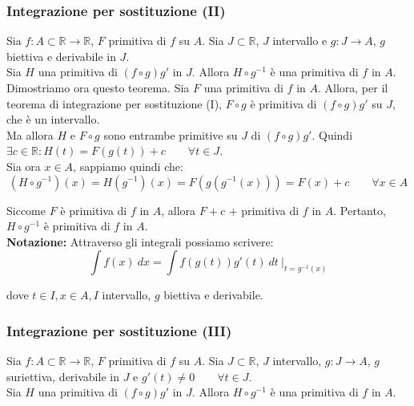 \documentclass{article}
\begin{document}
\subsubsection{Integrazione per sostituzione (II)}
Sia $f: A \subset \mathbb{R} \xrightarrow{} \mathbb{R}$, $F$ primitiva di $f$ su $A$. Sia $J \subset \mathbb{R}$, $J$ intervallo e $g: J \xrightarrow{} A$, $g$ biettiva e derivabile in $J$. \\
Sia $H$ una primitiva di $(f \circ g)g'$ in $J$. Allora $H \circ g^{-1}$ è una primitiva di $f$ in $A$.\\

\noindent Dimostriamo ora questo teorema. Sia $F$ una primitiva di $f$ in $A$. Allora, per il teorema di integrazione per sostituzione (I), $F \circ g$ è primitiva di $(f \circ g)g'$ su $J$, che è un intervallo.\\
Ma allora $H$ e $F \circ g$ sono entrambe primitive su $J$ di $(f \circ g)g'$. Quindi $\exists c \in \mathbb{R} : H(t) = F(g(t)) + c \qquad \forall t \in J$.\\
Sia ora $x \in A$, sappiamo quindi che:
\begin{equation*}
    (H \circ g^{-1})(x) = H(g^{-1})(x) = F(g(g^{-1}(x))) = F(x) + c \qquad \forall x \in A
\end{equation*}

\noindent Siccome $F$ è primitiva di $f$ in $A$, allora $F + c$ + primitiva di $f$ in $A$. Pertanto, $H \circ g^{-1}$ è primitiva di $f$ in $A$.\\

\noindent\textbf{Notazione:} Attraverso gli integrali possiamo scrivere:
\begin{equation*}
    \int f(x) \ dx = \int f(g(t))g'(t) \ dt \ \bigg|_{t = {g^{-1}(x)}}
\end{equation*}

\noindent dove $t \in I, x \in A, I$ intervallo, $g$ biettiva e derivabile.

\subsubsection{Integrazione per sostituzione (III)}
Sia $f: A \subset \mathbb{R} \xrightarrow{} \mathbb{R}$, $F$ primitiva di $f$ su $A$. Sia $J \subset \mathbb{R}$, $J$ intervallo, $g: J \xrightarrow{} A$, $g$ suriettiva, derivabile in $J$ e $g'(t) \neq 0 \qquad \forall t \in J$. \\
Sia $H$ una primitiva di $(f \circ g)g'$ in $J$. Allora $H \circ g^{-1}$ è una primitiva di $f$ in $A$.\\
\end{document}
